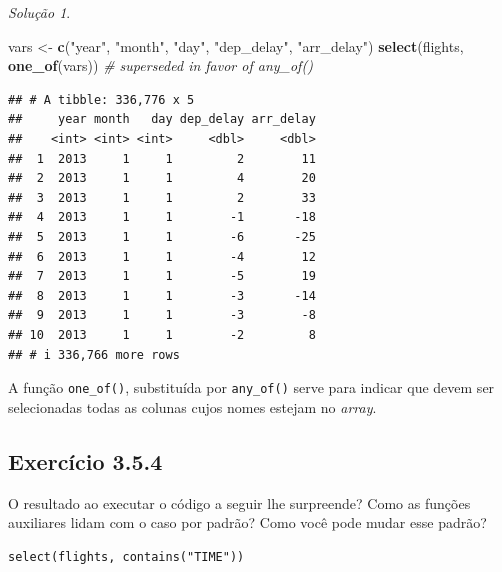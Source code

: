 \documentclass[
]{latex/krantz}
\newenvironment{Shaded}{\begin{snugshade}}{\end{snugshade}}
\newcommand{\CommentTok}[1]{\textcolor[rgb]{0.56,0.35,0.01}{\textit{#1}}}
\newcommand{\FunctionTok}[1]{\textcolor[rgb]{0.13,0.29,0.53}{\textbf{#1}}}
\newcommand{\NormalTok}[1]{#1}
\newcommand{\OtherTok}[1]{\textcolor[rgb]{0.56,0.35,0.01}{#1}}
\newcommand{\StringTok}[1]{\textcolor[rgb]{0.31,0.60,0.02}{#1}}
\theoremstyle{definition}
\theoremstyle{definition}
\theoremstyle{definition}
\theoremstyle{definition}
\theoremstyle{remark}
\newtheorem*{solution}{Solução}
\begin{document}
\begin{solution}
\leavevmode

\begin{Shaded}
\begin{Highlighting}[]
\NormalTok{vars }\OtherTok{\textless{}{-}} \FunctionTok{c}\NormalTok{(}\StringTok{"year"}\NormalTok{, }\StringTok{"month"}\NormalTok{, }\StringTok{"day"}\NormalTok{, }\StringTok{"dep\_delay"}\NormalTok{, }\StringTok{"arr\_delay"}\NormalTok{)}
\FunctionTok{select}\NormalTok{(flights, }\FunctionTok{one\_of}\NormalTok{(vars)) }\CommentTok{\# superseded in favor of \textasciigrave{}any\_of()\textasciigrave{}}
\end{Highlighting}
\end{Shaded}

\begin{verbatim}
## # A tibble: 336,776 x 5
##     year month   day dep_delay arr_delay
##    <int> <int> <int>     <dbl>     <dbl>
##  1  2013     1     1         2        11
##  2  2013     1     1         4        20
##  3  2013     1     1         2        33
##  4  2013     1     1        -1       -18
##  5  2013     1     1        -6       -25
##  6  2013     1     1        -4        12
##  7  2013     1     1        -5        19
##  8  2013     1     1        -3       -14
##  9  2013     1     1        -3        -8
## 10  2013     1     1        -2         8
## # i 336,766 more rows
\end{verbatim}

A função \texttt{one\_of()}, substituída por \texttt{any\_of()} serve para indicar que devem ser selecionadas todas as colunas cujos nomes estejam no \emph{array}.

\end{solution}

\hypertarget{exr3-5-4}{%
\subsection*{Exercício 3.5.4}\label{exr3-5-4}}

O resultado ao executar o código a seguir lhe surpreende? Como as funções auxiliares lidam com o caso por padrão? Como você pode mudar esse padrão?

\begin{verbatim}
select(flights, contains("TIME"))
\end{verbatim}
\end{document}
